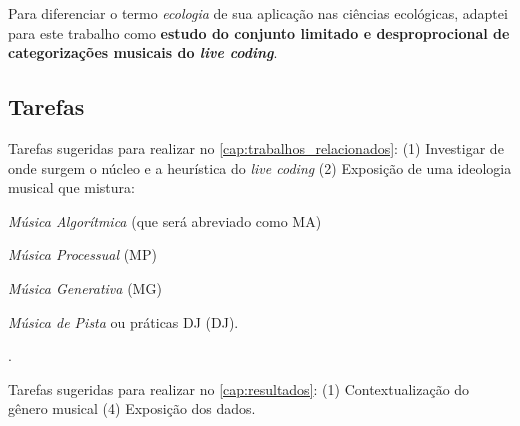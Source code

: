 Para diferenciar o termo \emph{ecologia} de sua aplicação nas ciências ecológicas, adaptei para este trabalho como \textbf{estudo do conjunto limitado e desproprocional de categorizações musicais do \emph{live coding}}.


\subsection*{Tarefas}

Tarefas sugeridas para realizar no \autoref{cap:trabalhos_relacionados}: (1) Investigar de onde surgem o núcleo e a heurística do \emph{live coding}  (2) Exposição de uma ideologia musical que mistura:\begin{inparaenum}[(a)]
\item \emph{Música Algorítmica} (que será abreviado como MA)
\item \emph{Música Processual} (MP)
\item \emph{Música Generativa} (MG)
\item \emph{Música de Pista} ou práticas DJ (DJ).
\end{inparaenum}. 

Tarefas sugeridas para realizar no \autoref{cap:resultados}: (1) Contextualização do gênero musical (4) Exposição dos dados.

